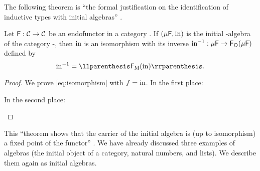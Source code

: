 The following theorem is ``the formal justification on the
identification of inductive types with initial algebras''
\parencite[17]{vene-2000}.

\begin{theorem}
  \label{the:lambek}


  Let $\mathsf{F}: \mathcal{C} \to \mathcal{C}$ be an endofunctor in a category
  . If $(\mu\mathsf{F},\operatorname{in})$ is the initial -algebra of
  the category -\alg, then $\operatorname{in}$ is an isomorphism with its
  inverse $\operatorname{in}^{-1}: \mu\mathsf{F} \to \mathsf{F}_{\operatorname{O}}(\mu\mathsf{F})$ defined
  by
  \begin{equation}
    \label{eq:lambek}
    \inmo^{-1} = \cata{\funcM{F}(\inmo)}
    \text{.}
  \end{equation}

  \begin{proof}

    We prove \eqref{eq:isomorphism} with $f = \operatorname{in}$. In the first
    place:
    \begin{steps}
        \eqby{\eqref{eq:lambek}}
      \stepm{\cata\inmo}
        \eqby{\eqref{eq:cata-refl}}
    \end{steps}
    In the second place:
    \begin{steps}
        \eqby{\eqref{eq:lambek}}
    \end{steps}

  \end{proof}

\end{theorem}

This ``theorem shows that the carrier of the initial algebra is (up to
isomorphism) a fixed point of the functor'' \parencite[18]{vene-2000}.
We have already discussed three examples of algebras (the initial
object of a category, natural numbers, and lists). We describe them
again as initial algebras.

